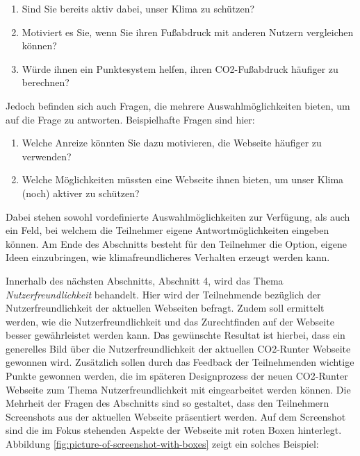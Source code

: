 \begin{enumerate}
    \item Sind Sie bereits aktiv dabei, unser Klima zu schützen?
    \item Motiviert es Sie, wenn Sie ihren Fußabdruck mit anderen Nutzern vergleichen können?
    \item Würde ihnen ein Punktesystem helfen, ihren CO2-Fußabdruck häufiger zu berechnen?
\end{enumerate}
Jedoch befinden sich auch Fragen, die mehrere Auswahlmöglichkeiten bieten, um auf die Frage zu antworten.
Beispielhafte Fragen sind hier:
\begin{enumerate}
    \item Welche Anreize könnten Sie dazu motivieren, die Webseite häufiger zu verwenden?
    \item Welche Möglichkeiten müssten eine Webseite ihnen bieten, um unser Klima (noch) aktiver zu schützen?
\end{enumerate}
Dabei stehen sowohl vordefinierte Auswahlmöglichkeiten zur Verfügung, als auch ein Feld, bei welchem die Teilnehmer eigene Antwortmöglichkeiten eingeben können.
Am Ende des Abschnitts besteht für den Teilnehmer die Option, eigene Ideen einzubringen, wie klimafreundlicheres Verhalten erzeugt werden kann.

Innerhalb des nächsten Abschnitts, Abschnitt 4, wird das Thema \textit{Nutzerfreundlichkeit} behandelt.
Hier wird der Teilnehmende bezüglich der Nutzerfreundlichkeit der aktuellen Webseiten befragt.
Zudem soll ermittelt werden, wie die Nutzerfreundlichkeit und das Zurechtfinden auf der Webseite besser gewährleistet werden kann.
Das gewünschte Resultat ist hierbei, dass ein generelles Bild über die Nutzerfreundlichkeit der aktuellen CO2-Runter Webseite gewonnen wird.
Zusätzlich sollen durch das Feedback der Teilnehmenden wichtige Punkte gewonnen werden, die im späteren Designprozess der neuen CO2-Runter Webseite zum Thema Nutzerfreundlichkeit mit eingearbeitet werden können.
Die Mehrheit der Fragen des Abschnitts sind so gestaltet, dass den Teilnehmern Screenshots aus der aktuellen Webseite präsentiert werden.
Auf dem Screenshot sind die im Fokus stehenden Aspekte der Webseite mit roten Boxen hinterlegt. Abbildung \ref{fig:picture-of-screenshot-with-boxes} zeigt ein solches Beispiel:

